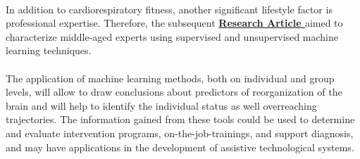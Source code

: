 \\
In addition to cardiorespiratory fitness, another significant lifestyle factor is professional expertise. Therefore, the subsequent \textbf{\hyperref[paperIV]{Research Article }} aimed to characterize middle-aged experts using supervised and unsupervised machine learning techniques.\\
\\
The application of machine learning methods, both on individual and group levels, will allow to draw conclusions about predictors of reorganization of the brain and will help to identify the individual status as well overreaching trajectories. The information gained from these tools could be used to determine and evaluate intervention programs, on-the-job-trainings, and support diagnosis, and may have applications in the development of assistive technological systems. 